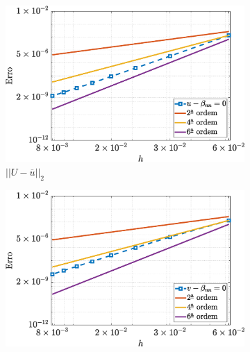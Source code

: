 \begin{figure}[H]
        \centering
	\caption{Erro para o campo de velocidades $(\overline{u},\tilde{v})$, vorticidade $(\tilde{\omega_{z}})$ e função de corrente $(\tilde{\psi})$, utilizando $Re=100$, $\beta_{nn} = 0$ e $Wi=1$ para o escoamento de fluido viscoelástico como o modelo UCM}
        \label{UCMerror1}
	\begin{subfigure}[b]{.47\textwidth}
            \includegraphics[width=\textwidth]{figures/Case12/UCM/Errors/NormErr_2nd_Re_100_Wi_1_epsilon_0_xi_0_alphaG_0_Dt_1e-06_at_0.05_tipsim_1_MMS_12_U.eps}
            \caption{$||U - \overline{u}||_{2}$}
            \label{error_u_2nd_Case1_ucm}
        \end{subfigure}
        \vspace{0.2cm}
        \qquad
        \begin{subfigure}[b]{.47\textwidth}
            \includegraphics[width=\textwidth]{figures/Case12/UCM/Errors/NormErr_2nd_Re_100_Wi_1_epsilon_0_xi_0_alphaG_0_Dt_1e-06_at_0.05_tipsim_1_MMS_12_V.eps}

\end{subfigure}
\end{figure}
